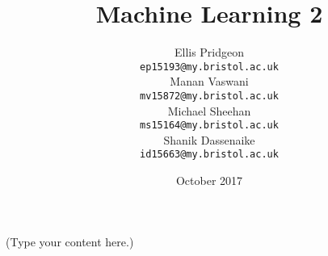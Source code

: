 \documentclass{article}
\date{October 2017}
\title{Machine Learning 2}
\author{
Ellis Pridgeon \\
\texttt{ep15193@my.bristol.ac.uk} \\
\And
Manan Vaswani \\
\texttt{mv15872@my.bristol.ac.uk} \\
\AND
Michael Sheehan \\
\texttt{ms15164@my.bristol.ac.uk} \\
\And
Shanik Dassenaike \\
\texttt{id15663@my.bristol.ac.uk}
}
\begin{document}
\vspace*{-80pt}
\maketitle

(Type your content here.)
\end{document}

